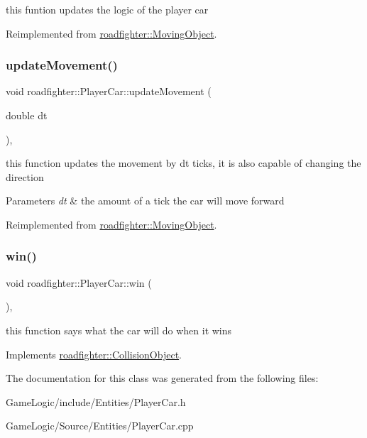 this funtion updates the logic of the player car 

Reimplemented from \hyperlink{classroadfighter_1_1MovingObject_a2c5d69054a59fc5c6d7458f864ee9d57}{roadfighter\+::\+Moving\+Object}.

\mbox{\label{classroadfighter_1_1PlayerCar_aa1dcbec01dde1b212e4919b61338edde}} 
\subsubsection{\texorpdfstring{update\+Movement()}{updateMovement()}}
{\footnotesize\ttfamily void roadfighter\+::\+Player\+Car\+::update\+Movement (\begin{DoxyParamCaption}\item[{double}]{dt }\end{DoxyParamCaption})\hspace{0.3cm}{\ttfamily [override]}, {\ttfamily [virtual]}}

this function updates the movement by dt ticks, it is also capable of changing the direction 
\begin{DoxyParams}{Parameters}
{\em dt} & the amount of a tick the car will move forward \\
\hline
\end{DoxyParams}


Reimplemented from \hyperlink{classroadfighter_1_1MovingObject_ac1918d96dac118c4bd7d99168d92867c}{roadfighter\+::\+Moving\+Object}.

\mbox{\label{classroadfighter_1_1PlayerCar_a12f0da24565a4fe64a7bf17fc7c37152}} 
\subsubsection{\texorpdfstring{win()}{win()}}
{\footnotesize\ttfamily void roadfighter\+::\+Player\+Car\+::win (\begin{DoxyParamCaption}{ }\end{DoxyParamCaption})\hspace{0.3cm}{\ttfamily [override]}, {\ttfamily [virtual]}}

this function says what the car will do when it wins 

Implements \hyperlink{classroadfighter_1_1CollisionObject_a03ce1ae52676088839d85c597743052c}{roadfighter\+::\+Collision\+Object}.



The documentation for this class was generated from the following files\+:\begin{DoxyCompactItemize}
\item 
Game\+Logic/include/\+Entities/Player\+Car.\+h\item 
Game\+Logic/\+Source/\+Entities/Player\+Car.\+cpp\end{DoxyCompactItemize}
